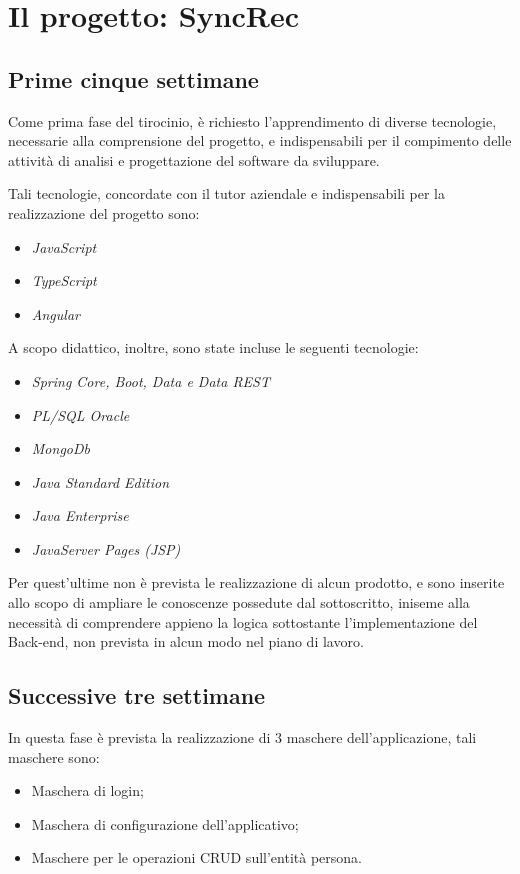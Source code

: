 \section{Il progetto: SyncRec}\label{ch-2.2}
\subsection{Prime cinque settimane}
Come prima fase del tirocinio, è richiesto l'apprendimento di diverse tecnologie, necessarie alla comprensione del progetto, e indispensabili per il compimento delle attività di analisi e progettazione del software da sviluppare.

Tali tecnologie, concordate con il tutor aziendale e indispensabili per la realizzazione del progetto sono:
\begin{itemize}
	\item \textit{JavaScript}
	\item \textit{TypeScript}
	\item \textit{Angular}
\end{itemize}

A scopo didattico, inoltre, sono state incluse le seguenti tecnologie:
\begin{itemize}
	\item \textit{Spring Core, Boot, Data e Data REST}
	\item \textit{PL/SQL Oracle}
	\item \textit{MongoDb}
	\item \textit{Java Standard Edition}
	\item \textit{Java Enterprise}
	\item \textit{JavaServer Pages (JSP)}
\end{itemize}

Per quest'ultime non è prevista le realizzazione di alcun prodotto, e sono inserite allo scopo di ampliare le conoscenze possedute dal sottoscritto, iniseme alla necessità di comprendere appieno la logica sottostante l'implementazione del Back-end, non prevista in alcun modo nel piano di lavoro.\\

\subsection{Successive tre settimane}
In questa fase è prevista la realizzazione di 3 maschere dell'applicazione, tali maschere sono:

\begin{itemize}
	\item Maschera di login;
	\item Maschera di configurazione dell'applicativo;
	\item Maschere per le operazioni \gls{CRUD} sull'entità persona.
\end{itemize}


